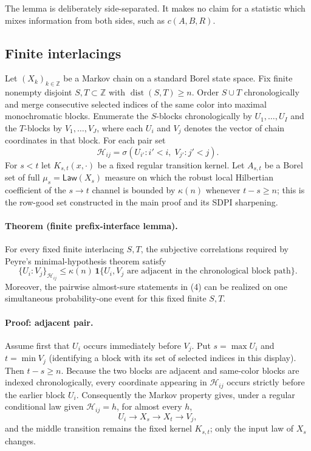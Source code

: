 The lemma is deliberately side-separated.  It makes no claim for a statistic
which mixes information from both sides, such as $c(A,B,R)$.

\subsection{Finite interlacings}

Let $(X_k)_{k\in\mathbb Z}$ be a Markov chain on a standard Borel state space.
Fix finite nonempty disjoint $S,T\subset\mathbb Z$ with
$\operatorname{dist}(S,T)\ge n$.  Order $S\cup T$ chronologically and merge
consecutive selected indices of the same color into maximal monochromatic
blocks.  Enumerate the $S$-blocks chronologically by $U_1,\dots,U_I$ and the
$T$-blocks by $V_1,\dots,V_J$, where each $U_i$ and $V_j$ denotes the vector of
chain coordinates in that block.  For each pair set
\[
 \mathcal H_{ij}
 =\sigma(U_{i'}:i'<i,\;V_{j'}:j'<j).
\tag{3}
\]
For $s<t$ let $K_{s,t}(x,\cdot)$ be a fixed regular transition kernel.  Let
$A_{s,t}$ be a Borel set of full $\mu_s=\mathsf{Law}(X_s)$ measure on which the
robust local Hilbertian coefficient of the $s\to t$ channel is bounded by
$\kappa(n)$ whenever $t-s\ge n$; this is the row-good set constructed in the
main proof and its SDPI sharpening.

\paragraph{Theorem (finite prefix-interface lemma).}
For every fixed finite interlacing $S,T$, the subjective correlations required
by Peyre's minimal-hypothesis theorem satisfy
\[
 \boxed{
 \{U_i:V_j\}_{\mathcal H_{ij}}
 \le \kappa(n)\,
 \mathbf 1\{U_i,V_j\text{ are adjacent in the chronological block path}\}.
 }
\tag{4}
\]
Moreover, the pairwise almost-sure statements in (4) can be realized on one
simultaneous probability-one event for this fixed finite $S,T$.

\paragraph{Proof: adjacent pair.}
Assume first that $U_i$ occurs immediately before $V_j$.  Put
$s=\max U_i$ and $t=\min V_j$ (identifying a block with its set of selected
indices in this display).  Then $t-s\ge n$.  Because the two blocks are
adjacent and same-color blocks are indexed chronologically, every coordinate
appearing in $\mathcal H_{ij}$ occurs strictly before the earlier block $U_i$.
Consequently the Markov property gives, under a regular conditional law given
$\mathcal H_{ij}=h$, for almost every $h$,
\[
 U_i\longrightarrow X_s\longrightarrow X_t\longrightarrow V_j,
\tag{5}
\]
and the middle transition remains the fixed kernel $K_{s,t}$; only the input
law of $X_s$ changes.


